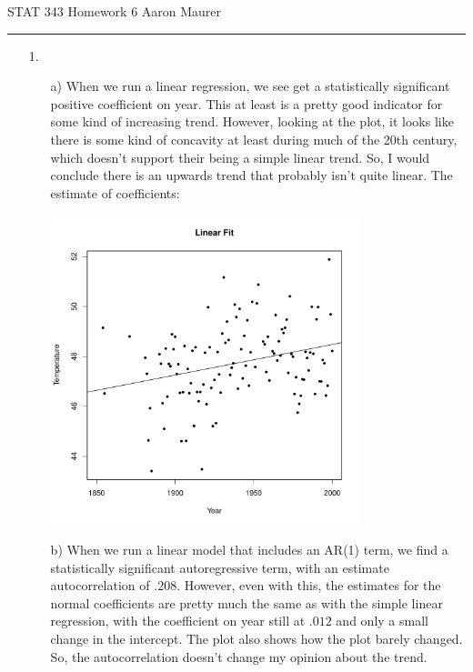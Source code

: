 \documentclass[11pt]{article}
\theoremstyle{definition}
\begin{document}
STAT 343 Homework 6 \hfill Aaron Maurer
\vspace{2mm}
\hrule
\vspace{2mm}
\begin{itemize} 
    \item[1.]
        \begin{itemize} 
            \item[a)]
                When we run a linear regression, we see get a statistically significant positive coefficient on year. This at least is a pretty good indicator for some kind of increasing trend. However, looking at the plot, it looks like there is some kind of concavity at least during much of the 20th century, which doesn't support their being a simple linear trend. So, I would conclude there is an upwards trend that probably isn't quite linear.  
                \smallskip
                The estimate of coefficients:
                \FloatBarrier
                 
                \FloatBarrier
                \begin{center}
                    \includegraphics[width=9cm]{hw7/hw7_1_a} 
                \end{center}
            \item[b)]
                When we run a linear model that includes an AR(1) term, we find a statistically significant autoregressive term, with an estimate autocorrelation of $.208$. However, even with this, the estimates for the normal coefficients are pretty much the same as with the simple linear regression, with the coefficient on year still at $.012$ and only a small change in the intercept. The plot also shows how the plot barely changed. So, the autocorrelation  doesn't change my opinion about the trend. 

\end{itemize}
\end{itemize}
\end{document}
